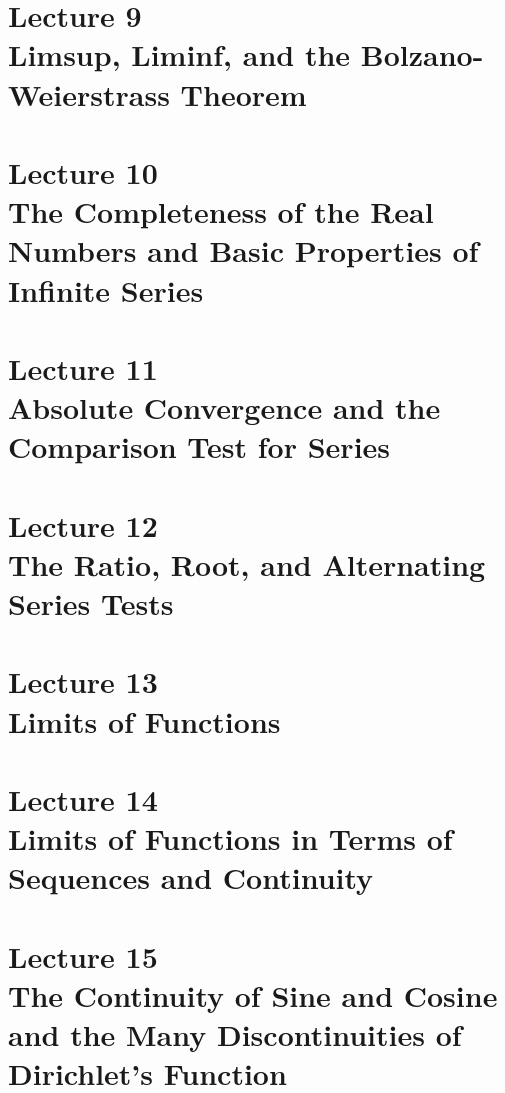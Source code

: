 \documentclass{article}
\begin{document}
\section[Limsup, Liminf, and the Bolzano-Weierstrass Theorem]{Lecture 9 \\ {\normalsize Limsup, Liminf, and the Bolzano-Weierstrass Theorem}} \newpage 
\section[The Completeness of the Real Numbers and Basic Properties of Infinite Series]{Lecture 10 \\ {\normalsize The Completeness of the Real Numbers and Basic Properties of Infinite Series}}  \newpage 
\section[Absolute Convergence and the Comparison Test for Series]{Lecture 11 \\ {\normalsize Absolute Convergence and the Comparison Test for Series}} \newpage 
\section[The Ratio, Root, and Alternating Series Tests]{Lecture 12 \\ {\normalsize The Ratio, Root, and Alternating Series Tests}} \newpage 
\section[Limits of Functions]{Lecture 13 \\ {\normalsize Limits of Functions}}  \newpage 
\section[Limits of Functions in Terms of Sequences and Continuity]{Lecture 14 \\ {\normalsize Limits of Functions in Terms of Sequences and Continuity}} \newpage 
\section[The Continuity of Sine and Cosine and the Many Discontinuities of Dirichlet's Function]{Lecture 15 \\ {\normalsize The Continuity of Sine and Cosine and the Many Discontinuities of Dirichlet's Function}} \newpage 
\end{document}
